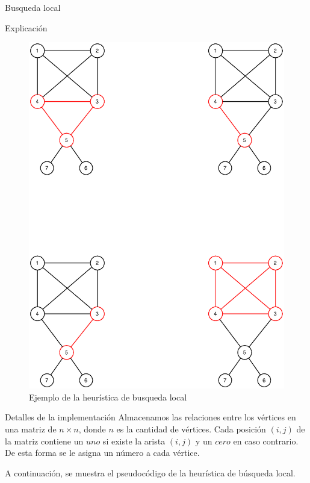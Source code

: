 \begin{section}{Busqueda local}
\begin{subsection}{Explicación}
			\begin{figure}[H]
				\centering
		    	\includegraphics[scale=0.5]{busqueda_local/seguimiento.eps}
			    \caption{Ejemplo de la heurística de busqueda local}
			    \label{fig:seguimiento_busqueda_local}
			\end{figure}
		\end{subsection}
		\begin{subsection}{Detalles de la implementación}
			Almacenamos las relaciones entre los vértices en una matriz de $n \times n$, donde $n$ es la cantidad de vértices. Cada posición $(i,j)$ de la matriz contiene un $uno$ si existe la arista $(i,j)$ y un $cero$ en caso contrario. De esta forma se le asigna un número a cada vértice.\VSP

			A continuación, se muestra el pseudocódigo de la heurística de búsqueda local.\\


\end{subsection}
\end{section}
